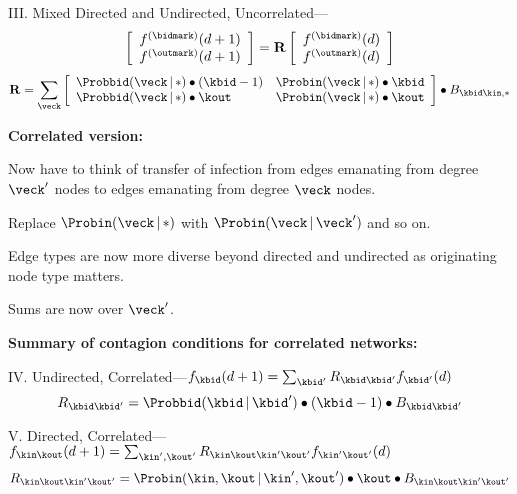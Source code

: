 \begin{frame}[plain]
      III. Mixed Directed and Undirected, Uncorrelated---
      $$
      \left[
        \begin{array}{c}
          f^{\textnormal{(\bidmark)}}(d+1) \\
          f^{\textnormal{(\outmark)}}(d+1)
        \end{array}
      \right]
      =
      \mathbf{R} 
      \left[
        \begin{array}{c}
          f^{\textnormal{(\bidmark)}}(d) \\
          f^{\textnormal{(\outmark)}}(d)
        \end{array}
      \right]
      $$
      $$
      \mathbf{R} 
      = 
      \sum_{\veck}
      \left[
        \begin{array}{ll}
          \Probbid(\veck\,|\, \ast)
          \bullet
          (\kbid-1)
          &
          \Probin(\veck\,|\, \ast)
          \bullet
          \kbid
          \\
          \Probbid(\veck\,|\, \ast)
          \bullet
          \kout
          &
          \Probin(\veck\,|\, \ast)
          \bullet
          \kout
        \end{array}
      \right]
      \bullet
      B_{\kbid\kin,\ast}
      $$
    
  



  \textbf{Correlated version:}
  
  
  
    Now have to think of transfer of infection
    from edges emanating from degree $\veck'$
    nodes 
    to edges emanating from 
    degree $\veck$ nodes.
  
    Replace 
    $\Probin(\veck\,|\, \ast)$ with
    $\Probin(\veck\,|\, \veck')$ and so on.
  
    Edge types are now more diverse beyond
    directed and undirected as originating node
    type matters.
  
    Sums are now over $\veck'$.
  



  \small
  \textbf{Summary of contagion conditions for correlated networks:}
    
    
      IV. Undirected, Correlated---$f_{\kbid}(d+1) = 
      \sum_{\kbid'}
      R_{\kbid\kbid'} 
      f_{\kbid'}(d)
      $
      $$
      R_{\kbid\kbid'} =
      \Probbid(\kbid\, |\, \kbid')
      \bullet
      (\kbid-1)
      \bullet
      B_{\kbid\kbid'}
      $$
    
      V. Directed, Correlated---$f_{\kin\kout}(d+1) = 
      \sum_{\kin',\kout'}
      R_{\kin\kout\kin'\kout'} 
      f_{\kin'\kout'}(d)
      $ 
      $$
      R_{\kin\kout\kin'\kout'} 
      =
      \Probin(\kin,\kout\, |\, \kin',\kout')
      \bullet
      \kout
      \bullet
      B_{\kin\kout\kin'\kout'} 
      $$ 
    

\end{frame}
